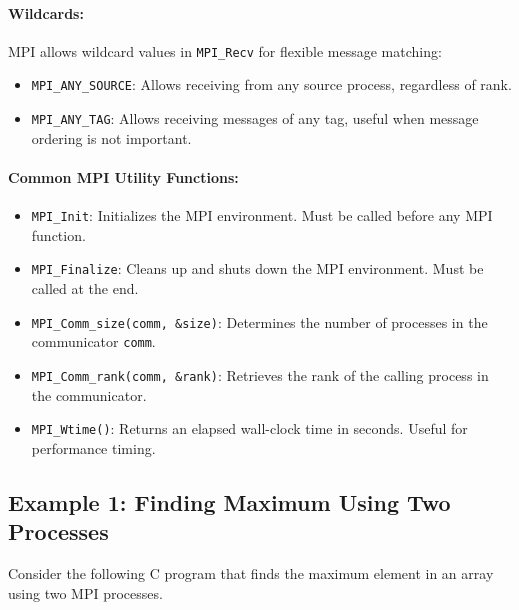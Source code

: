 \documentclass[12pt]{book}
\begin{document}
\paragraph{Wildcards:}
MPI allows wildcard values in \texttt{MPI\_Recv} for flexible message matching:
\begin{itemize}
    \item \texttt{MPI\_ANY\_SOURCE}: Allows receiving from any source process, regardless of rank.
    \item \texttt{MPI\_ANY\_TAG}: Allows receiving messages of any tag, useful when message ordering is not important.
\end{itemize}

\paragraph{Common MPI Utility Functions:}
\begin{itemize}
    \item \texttt{MPI\_Init}: Initializes the MPI environment. Must be called before any MPI function.
    \item \texttt{MPI\_Finalize}: Cleans up and shuts down the MPI environment. Must be called at the end.
    \item \texttt{MPI\_Comm\_size(comm, \&size)}: Determines the number of processes in the communicator \texttt{comm}.
    \item \texttt{MPI\_Comm\_rank(comm, \&rank)}: Retrieves the rank of the calling process in the communicator.
    \item \texttt{MPI\_Wtime()}: Returns an elapsed wall-clock time in seconds. Useful for performance timing.
\end{itemize}


\subsection{Example 1: Finding Maximum Using Two Processes}

Consider the following C program that finds the maximum element in an array using two MPI processes.
\end{document}
